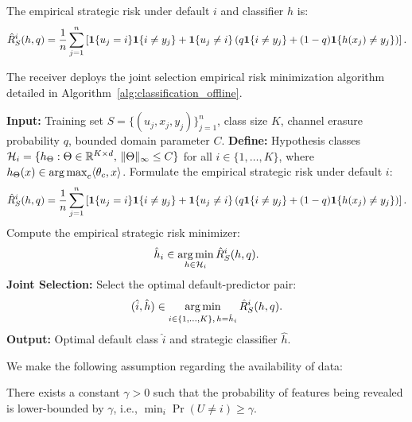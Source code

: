 The empirical strategic risk under default $i$ and classifier $h$ is:
\begin{equation}
    \label{eq:empirical_strategic_classification_risk}
    \hat{R}^i_S(h, q) = \frac{1}{n}\sum_{j=1}^n \left[ \mathbf{1}\{u_j = i\}\mathbf{1}\{i \ne y_j\} + \mathbf{1}\{u_j \ne i\} \left( q\mathbf{1}\{i \ne y_j\} + (1 - q)\mathbf{1}\{h(x_j) \ne y_j\} \right) \right].
\end{equation}

The receiver deploys the joint selection empirical risk minimization algorithm detailed in Algorithm~\ref{alg:classification_offline}.

\begin{algorithm}[htbp]
\caption{Strategic Classification Empirical Risk Minimization (SC-ERM)}
\label{alg:classification_offline}
\begin{algorithmic}[1]
\State \textbf{Input:} Training set $S = \{(u_j, x_j, y_j)\}_{j=1}^n$, class size $K$, channel erasure probability $q$, bounded domain parameter $C$.
\State \textbf{Define:} Hypothesis classes $\mathcal{H}_i = \{h_{\Theta} : \Theta \in \mathbb{R}^{K \times d}, \, \|\Theta\|_\infty \le C\}$ for all $i \in \{1,\dots,K\}$, where $h_{\Theta}(x) \in \operatorname*{arg\,max}_c \langle \theta_c, x \rangle$.
    \State Formulate the empirical strategic risk under default $i$:
    \begin{equation*}
        \hat{R}^i_S(h, q) = \frac{1}{n}\sum_{j=1}^n \left[ \mathbf{1}\{u_j = i\}\mathbf{1}\{i \ne y_j\} + \mathbf{1}\{u_j \ne i\} \left( q\mathbf{1}\{i \ne y_j\} + (1 - q)\mathbf{1}\{h(x_j) \ne y_j\} \right) \right].
    \end{equation*}
    \State Compute the empirical strategic risk minimizer:
    \begin{equation*}
        \hat{h}_i \in \operatorname*{arg\,min}_{h \in \mathcal{H}_i} \hat{R}^i_S(h, q).
    \end{equation*}
\EndFor
\State \textbf{Joint Selection:} Select the optimal default-predictor pair:
\begin{equation*}
    (\hat{i}, \hat{h}) \in \operatorname*{arg\,min}_{i \in \{1, \dots, K\}, \, h = \hat{h}_i} \hat{R}^i_S(h, q).
\end{equation*}
\State \textbf{Output:} Optimal default class $\hat{i}$ and strategic classifier $\hat{h}$.
\end{algorithmic}
\end{algorithm}
 

We make the following assumption regarding the availability of data:
\begin{assumption}
\label{ass:nondegenerate_mass}
There exists a constant $\gamma > 0$ such that the probability of features being revealed is lower-bounded by $\gamma$, i.e., $\min_{i} \Pr(U \ne i) \ge \gamma$.
\end{assumption}

